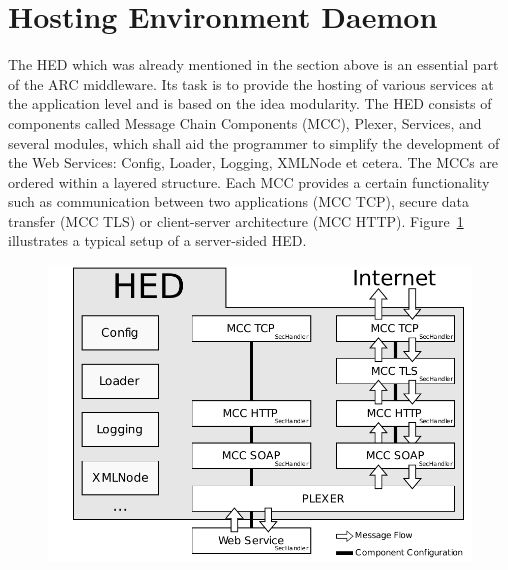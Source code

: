 

 


\section{Hosting Environment Daemon}

The HED which was already mentioned in the section above is an essential part of the ARC middleware. 
Its task is to provide the hosting of various services at the application level and is based on the idea modularity. %
The HED consists of components called Message Chain Components (MCC), Plexer, Services, and several modules, which shall aid the programmer to simplify the development of the Web Services: Config, Loader, Logging, XMLNode et cetera.
The MCCs are ordered within a layered structure. 
Each MCC provides a certain functionality such as communication between two applications (MCC TCP), secure data transfer (MCC TLS) or client-server architecture (MCC HTTP).
Figure~\ref{fig:HED_internal} illustrates a typical setup of a server-sided HED.

\begin{figure}[htb]
	\centering
	\includegraphics[width=13cm]{tex_introduction/HED2.pdf}
\label{fig:HED_internal}
\end{figure}

